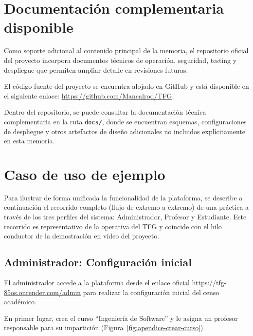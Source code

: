 \FloatBarrier
\chapter{Documentaci\'on complementaria disponible}\label{apendice-docs}

Como soporte adicional al contenido principal de la memoria, el repositorio oficial del proyecto incorpora documentos t\'ecnicos de operaci\'on, seguridad, testing y despliegue que permiten ampliar detalle en revisiones futuras. 

El c\'odigo fuente del proyecto se encuentra alojado en GitHub y est\'a disponible en el siguiente enlace: \url{https://github.com/Mancalrod/TFG}. 

Dentro del repositorio, se puede consultar la documentaci\'on t\'ecnica complementaria en la ruta \texttt{docs/}, donde se encuentran esquemas, configuraciones de despliegue y otros artefactos de dise\~no adicionales no incluidos expl\'icitamente en esta memoria.

\FloatBarrier
\chapter{Caso de uso de ejemplo}\label{apendice-caso-uso}

Para ilustrar de forma unificada la funcionalidad de la plataforma, se describe a continuaci\'on el recorrido completo (flujo de extremo a extremo) de una pr\'actica a trav\'es de los tres perfiles del sistema: Administrador, Profesor y Estudiante. Este recorrido es representativo de la operativa del TFG y coincide con el hilo conductor de la demostraci\'on en v\'ideo del proyecto.

\section{Administrador: Configuraci\'on inicial}

El administrador accede a la plataforma desde el enlace oficial \url{https://tfg-85os.onrender.com/admin} para realizar la configuraci\'on inicial del censo acad\'emico.

En primer lugar, crea el curso ``Ingenier\'ia de Software'' y le asigna un profesor responsable para su impartici\'on (Figura~\ref{fig:apendice-crear-curso}).


